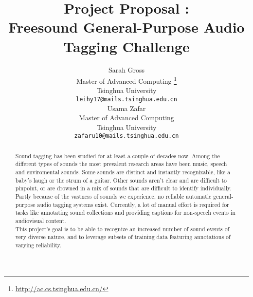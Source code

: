 \documentclass{article} %
\title{Project Proposal : \\Freesound General-Purpose Audio Tagging Challenge}
\author{
Sarah Gross \\
Master of Advanced Computing \thanks{\url{http://ac.cs.tsinghua.edu.cn/}}\\
Tsinghua University\\
\texttt{leihy17@mails.tsinghua.edu.cn} \\
\And
Usama Zafar\\
Master of Advanced Computing\\
Tsinghua University\\
\texttt{zafaru10@mails.tsinghua.edu.cn} \\
}
\begin{document}
\maketitle

\begin{abstract}
	Sound tagging has been studied for at least a couple of decades now. Among the different types of sounds the most prevalent research areas have been music, speech and enviromental sounds. Some sounds are distinct and instantly recognizable, like a baby's laugh or the strum of a guitar. Other sounds aren't clear and are difficult to pinpoint, or are drowned in a mix of sounds that are difficult to identify individually.\\
	\newline
    Partly because of the vastness of sounds we experience, no reliable automatic general-purpose audio tagging systems exist. Currently, a lot of manual effort is required for tasks like annotating sound collections and providing captions for non-speech events in audiovisual content.\\
	\newline
    This project's goal is to be able to recognize an increased number of sound events of very diverse nature, and to leverage subsets of training data featuring annotations of varying reliability.
\end{abstract}
\end{document}
